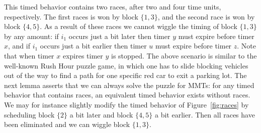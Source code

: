 \fi
This timed behavior contains two races, after two and four time units, respectively.
The first races is won by block $\{ 1, 3 \}$, and the second race is won by block $\{ 4, 5 \}$.
As a result of these races we cannot wiggle the timing of block $\{ 1, 3 \}$ by any amount:
if $i_1$ occurs just a bit later then timer $y$ must expire before timer $x$,
and if $i_1$ occurs just a bit earlier then timer $u$ must expire before timer $z$.
Note that when timer $x$ expires timer $y$ is stopped.
%
The above scenario is similar to the well-known Rush Hour puzzle game,
in which one has to slide blocking vehicles out of the way to find a path for one specific red car to exit a parking lot.
The next lemma asserts that we can always solve the puzzle for MMTs: for any timed behavior that contains races,
an equivalent timed behavior exists without races.
We may for instance slightly modify the timed behavior of Figure~\ref{fig:races} by scheduling block $\{ 2  \}$
a bit later and block $\{ 4, 5 \}$ a bit earlier.
Then all races have been eliminated and we can wiggle block $\{ 1, 3 \}$.


